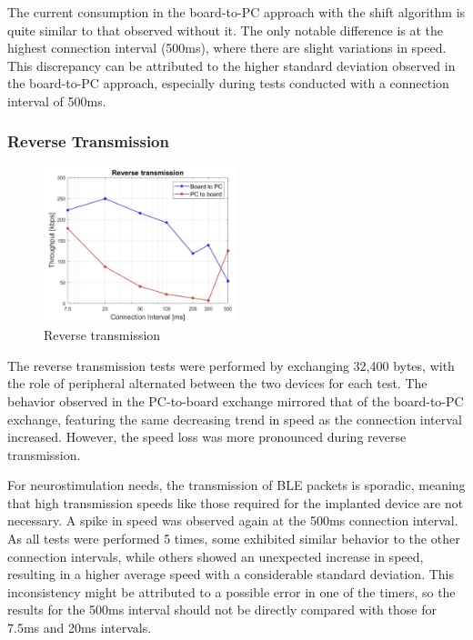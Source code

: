 \documentclass{Configuration_Files/PoliMi3i_thesis}
\begin{document}
The current consumption in the board-to-PC approach with the shift algorithm is quite similar to that observed without it. The only notable difference is at the highest connection interval (500ms), where there are slight variations in speed. This discrepancy can be attributed to the higher standard deviation observed in the board-to-PC approach, especially during tests conducted with a connection interval of 500ms.

\subsubsection*{Reverse Transmission}

\begin{figure}[H]
    \centering
    \includegraphics[width=0.5\textwidth]{Results Manuel/figure39}
    \caption{Reverse transmission}
    \label{manuel_results_39}
\end{figure}

The reverse transmission tests were performed by exchanging 32,400 bytes, with the role of peripheral alternated between the two devices for each test. The behavior observed in the PC-to-board exchange mirrored that of the board-to-PC exchange, featuring the same decreasing trend in speed as the connection interval increased. However, the speed loss was more pronounced during reverse transmission.

For neurostimulation needs, the transmission of BLE packets is sporadic, meaning that high transmission speeds like those required for the implanted device are not necessary. A spike in speed was observed again at the 500ms connection interval. As all tests were performed 5 times, some exhibited similar behavior to the other connection intervals, while others showed an unexpected increase in speed, resulting in a higher average speed with a considerable standard deviation. This inconsistency might be attributed to a possible error in one of the timers, so the results for the 500ms interval should not be directly compared with those for 7.5ms and 20ms intervals.
\end{document}
